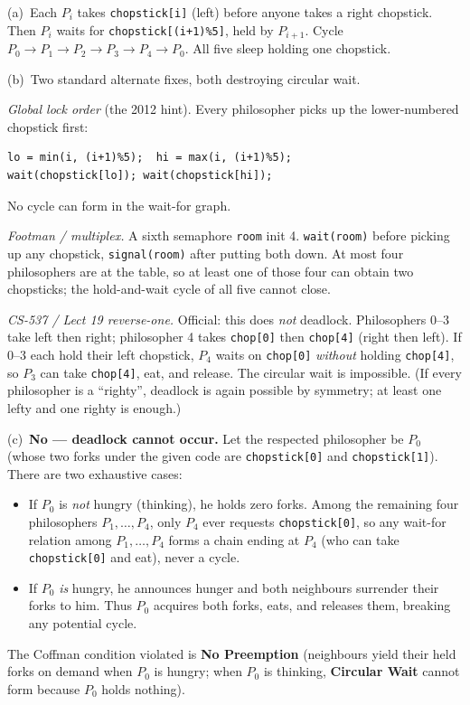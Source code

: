 \documentclass[11pt,a4paper]{article}
\newenvironment{Sol}{%
  \begin{tcolorbox}[sboxstyle, title={Solution}]%
}{%
  \end{tcolorbox}\vspace{0.35em}%
}
\begin{document}
\begin{Sol}
(a)~Each $P_i$ takes \texttt{chopstick[i]} (left) before anyone takes a
right chopstick. Then $P_i$ waits for \texttt{chopstick[(i+1)\%5]}, held by
$P_{i+1}$. Cycle $P_0 \to P_1 \to P_2 \to P_3 \to P_4 \to P_0$. All five
sleep holding one chopstick.

(b)~Two standard alternate fixes, both destroying circular wait.

\emph{Global lock order} (the 2012 hint). Every philosopher picks up the
lower-numbered chopstick first:
\begin{lstlisting}[numbers=none]
lo = min(i, (i+1)%5);  hi = max(i, (i+1)%5);
wait(chopstick[lo]); wait(chopstick[hi]);
\end{lstlisting}
No cycle can form in the wait-for graph.

\emph{Footman / multiplex.} A sixth semaphore \texttt{room} init 4.
\texttt{wait(room)} before picking up any chopstick,
\texttt{signal(room)} after putting both down. At most four philosophers
are at the table, so at least one of those four can obtain two chopsticks;
the hold-and-wait cycle of all five cannot close.

\emph{CS-537 / Lect 19 reverse-one.} Official: this does \emph{not}
deadlock. Philosophers $0$--$3$ take left then right; philosopher 4 takes
\texttt{chop[0]} then \texttt{chop[4]} (right then left). If $0$--$3$ each
hold their left chopstick, $P_4$ waits on \texttt{chop[0]} \emph{without}
holding \texttt{chop[4]}, so $P_3$ can take \texttt{chop[4]}, eat, and
release. The circular wait is impossible. (If every philosopher is a
``righty'', deadlock is again possible by symmetry; at least one lefty and
one righty is enough.)

(c)~\textbf{No --- deadlock cannot occur.} Let the respected philosopher be $P_0$ (whose two forks under the given code are \texttt{chopstick[0]} and \texttt{chopstick[1]}). There are two exhaustive cases:
\begin{itemize}
  \item If $P_0$ is \emph{not} hungry (thinking), he holds zero forks. Among the remaining four philosophers $P_1,\ldots,P_4$, only $P_4$ ever requests \texttt{chopstick[0]}, so any wait-for relation among $P_1,\ldots,P_4$ forms a chain ending at $P_4$ (who can take \texttt{chopstick[0]} and eat), never a cycle.
  \item If $P_0$ \emph{is} hungry, he announces hunger and both neighbours surrender their forks to him. Thus $P_0$ acquires both forks, eats, and releases them, breaking any potential cycle.
\end{itemize}
The Coffman condition violated is \textbf{No Preemption} (neighbours yield their held forks on demand when $P_0$ is hungry; when $P_0$ is thinking, \textbf{Circular Wait} cannot form because $P_0$ holds nothing).


\end{Sol}
\end{document}
